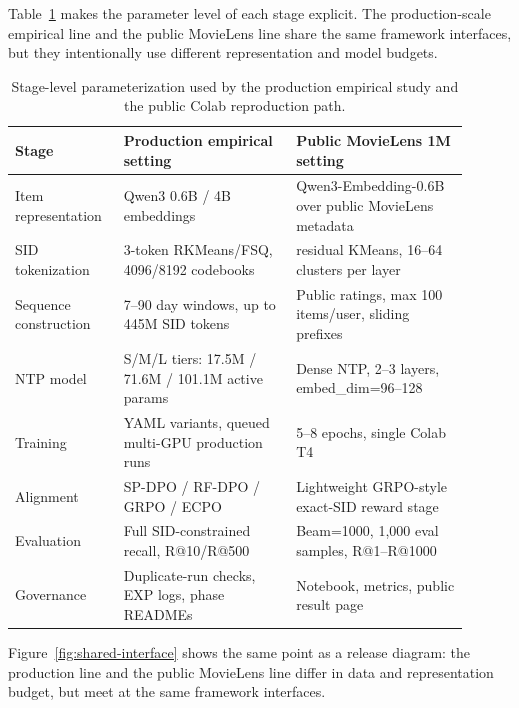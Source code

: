 \documentclass[11pt]{article}
\begin{document}
Table~\ref{tab:stage-parameters} makes the parameter level of each stage explicit. The production-scale empirical line and the public MovieLens line share the same framework interfaces, but they intentionally use different representation and model budgets.

\begin{table}[t]
\centering
\caption{Stage-level parameterization used by the production empirical study and the public Colab reproduction path.}
\label{tab:stage-parameters}
\begin{tabular}{p{0.20\linewidth}p{0.35\linewidth}p{0.35\linewidth}}
\toprule
Stage & Production empirical setting & Public MovieLens 1M setting \\
\midrule
Item representation & Qwen3 0.6B / 4B embeddings & Qwen3-Embedding-0.6B over public MovieLens metadata \\
SID tokenization & 3-token RKMeans/FSQ, 4096/8192 codebooks & residual KMeans, 16--64 clusters per layer \\
Sequence construction & 7--90 day windows, up to 445M SID tokens & Public ratings, max 100 items/user, sliding prefixes \\
NTP model & S/M/L tiers: 17.5M / 71.6M / 101.1M active params & Dense NTP, 2--3 layers, embed\_dim=96--128 \\
Training & YAML variants, queued multi-GPU production runs & 5--8 epochs, single Colab T4 \\
Alignment & SP-DPO / RF-DPO / GRPO / ECPO & Lightweight GRPO-style exact-SID reward stage \\
Evaluation & Full SID-constrained recall, R@10/R@500 & Beam=1000, 1,000 eval samples, R@1--R@1000 \\
Governance & Duplicate-run checks, EXP logs, phase READMEs & Notebook, metrics, public result page \\
\bottomrule
\end{tabular}
\end{table}

Figure~\ref{fig:shared-interface} shows the same point as a release diagram: the production line and the public MovieLens line differ in data and representation budget, but meet at the same framework interfaces.
\end{document}
